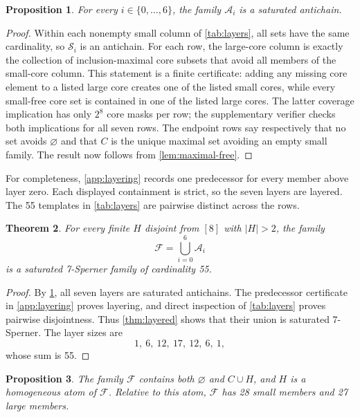 \documentclass[a4paper,fleqn,longmktitle]{cas-sc}
\newtheorem{theorem}{Theorem}[section]
\newtheorem{proposition}[theorem]{Proposition}
\theoremstyle{definition}
\theoremstyle{remark}
\newcommand{\family}{\mathcal{F}}
\newcommand{\smallcores}{\mathcal{S}}
\begin{document}
\begin{proposition}
\label{prop:layer-certificate}
For every $i\in\{0,\ldots,6\}$, the family $\mathcal A_i$ is a saturated
antichain.
\end{proposition}

\begin{proof}
Within each nonempty small column of \cref{tab:layers}, all sets have the same
cardinality, so $\smallcores_i$ is an antichain.  For each row, the large-core
column is exactly the collection of inclusion-maximal core subsets that avoid
all members of the small-core column.  This statement is a finite certificate:
adding any missing core element to a listed large core creates one of the
listed small cores, while every small-free core set is contained in one of the
listed large cores.  The latter coverage implication has only $2^8$ core
masks per row; the supplementary verifier checks both implications for all
seven rows.  The endpoint rows say respectively that no set avoids
$\varnothing$ and that $C$ is the unique maximal set avoiding an empty small
family.  The result now follows from \cref{lem:maximal-free}.
\end{proof}

For completeness, \cref{app:layering} records one predecessor for every member
above layer zero.  Each displayed containment is strict, so the seven layers
are layered.  The 55 templates in \cref{tab:layers} are pairwise distinct
across the rows.

\begin{theorem}
\label{thm:size55}
For every finite $H$ disjoint from $[8]$ with $|H|>2$, the family
\[
  \family=\bigcup_{i=0}^{6}\mathcal A_i
\]
is a saturated 7-Sperner family of cardinality 55.
\end{theorem}

\begin{proof}
By \cref{prop:layer-certificate}, all seven layers are saturated antichains.
The predecessor certificate in \cref{app:layering} proves layering, and direct
inspection of \cref{tab:layers} proves pairwise disjointness.  Thus
\cref{thm:layered} shows that their union is saturated 7-Sperner.  The layer
sizes are
\[
  1,\ 6,\ 12,\ 17,\ 12,\ 6,\ 1,
\]
whose sum is 55.
\end{proof}

\begin{proposition}
\label{prop:endpoints-atom}
The family $\family$ contains both $\varnothing$ and $C\cup H$, and $H$ is a
homogeneous atom of $\family$.  Relative to this atom, $\family$ has 28 small
members and 27 large members.
\end{proposition}
\end{document}
